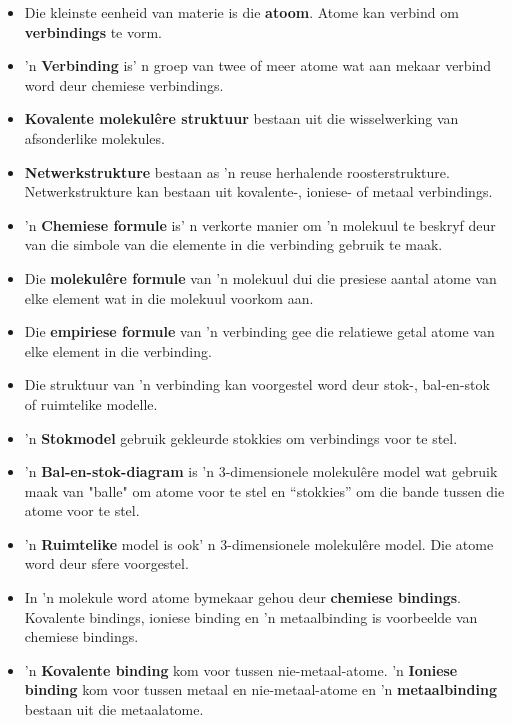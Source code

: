       \label{m38120*id311034}\begin{itemize}[noitemsep]
            \label{m38120*uid67}\item Die kleinste eenheid van materie is die \textbf{atoom}. Atome kan verbind om \textbf{verbindings} te vorm.
\label{m38120*uid68}\item 'n \textbf{Verbinding} is' n groep van twee of meer atome wat aan mekaar verbind word deur chemiese verbindings. 
\label{m38120*uid69}\item \textbf{Kovalente molekul\^{e}re struktuur} bestaan uit die wisselwerking van afsonderlike molekules.
\item \textbf{Netwerkstrukture} bestaan as 'n reuse herhalende roosterstrukture. Netwerkstrukture kan bestaan uit kovalente-, ioniese- of metaal verbindings.  
\label{m38120*uid71}\item 'n \textbf{Chemiese formule} is' n verkorte manier om 'n molekuul te beskryf deur van die simbole van die elemente in die verbinding gebruik te maak.
\label{m38120*uid72}\item Die \textbf{molekul\^{e}re formule} van 'n molekuul dui die presiese aantal atome van elke element wat in die molekuul voorkom aan.
\label{m38120*uid73}\item Die \textbf{empiriese formule} van 'n verbinding gee die relatiewe getal atome van elke element in die verbinding.
\label{m38120*uid70}\item Die struktuur van 'n verbinding kan voorgestel word deur stok-, bal-en-stok of ruimtelike modelle.
\item 'n \textbf{Stokmodel} gebruik gekleurde stokkies om verbindings voor te stel.
\label{m38120*uid75}\item 'n \textbf{Bal-en-stok-diagram} is 'n 3-dimensionele molekulêre model wat gebruik maak van "balle" om atome voor te stel en “stokkies” om die bande tussen die atome voor te stel.
\label{m38120*uid76}\item 'n \textbf{Ruimtelike} model is ook' n 3-dimensionele molekulêre model. Die atome word deur sfere voorgestel.
\label{m38120*uid77}\item In 'n molekule word atome bymekaar gehou deur \textbf{chemiese bindings}. Kovalente bindings, ioniese binding en 'n metaalbinding is voorbeelde van chemiese bindings.
\label{m38120*uid78}\item 'n \textbf{Kovalente binding} kom voor tussen nie-metaal-atome. 'n \textbf{Ioniese binding} kom voor tussen metaal en nie-metaal-atome en 'n \textbf{metaalbinding} bestaan uit die metaalatome.
\end{itemize}
